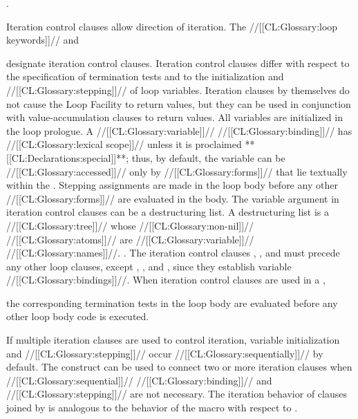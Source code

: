 \endsubsubsection%


 \Seesection\TraversalRules.

\endsubsubsection%

\endsubsection%

 

Iteration control clauses allow direction of  iteration. The //[[CL:Glossary:loop keywords]]//  and 

designate iteration control clauses. Iteration control clauses differ with respect to the specification of termination tests and to the initialization and //[[CL:Glossary:stepping]]// of loop variables.  Iteration clauses by themselves do not cause the Loop Facility to return values, but they can be used in conjunction with value-accumulation clauses to return values.  
  All variables are initialized in the loop prologue.   A //[[CL:Glossary:variable]]// //[[CL:Glossary:binding]]// has //[[CL:Glossary:lexical scope]]// unless it is proclaimed **[[CL:Declarations:special]]**; thus, by default, the variable can be //[[CL:Glossary:accessed]]// only by //[[CL:Glossary:forms]]//  that lie textually within the . Stepping assignments are made in the loop body before any other //[[CL:Glossary:forms]]// are evaluated in the body.  
  The variable argument in iteration control clauses can be a  destructuring list.  A destructuring list is a //[[CL:Glossary:tree]]// whose //[[CL:Glossary:non-nil]]// //[[CL:Glossary:atoms]]// are //[[CL:Glossary:variable]]// //[[CL:Glossary:names]]//. \Seesection\DestructuringLOOPVars.
  The iteration control clauses , ,  and   must precede any other loop clauses, except
  , , and , since they establish variable //[[CL:Glossary:bindings]]//.   When iteration control clauses are used in a ,

the corresponding termination tests in the loop body are evaluated before any other loop body code is executed.
 
  If multiple iteration clauses are used to control iteration, variable initialization and //[[CL:Glossary:stepping]]// occur //[[CL:Glossary:sequentially]]// by default.   The  construct can be used to connect two or more iteration clauses when //[[CL:Glossary:sequential]]// //[[CL:Glossary:binding]]// and  //[[CL:Glossary:stepping]]// are not necessary. The iteration behavior of clauses joined by  is analogous to the behavior of the macro  with respect to .

